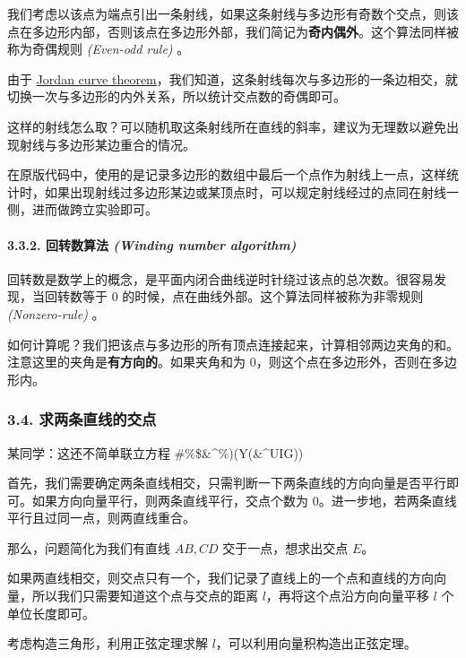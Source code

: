 我们考虑以该点为端点引出一条射线，如果这条射线与多边形有奇数个交点，则该点在多边形内部，否则该点在多边形外部，我们简记为\textbf{奇内偶外}。这个算法同样被称为奇偶规则 {\em (Even-odd rule) }。

由于 \href{https://en.wikipedia.org/wiki/Jordan_curve_theorem}{Jordan curve theorem}，我们知道，这条射线每次与多边形的一条边相交，就切换一次与多边形的内外关系，所以统计交点数的奇偶即可。

这样的射线怎么取？可以随机取这条射线所在直线的斜率，建议为无理数以避免出现射线与多边形某边重合的情况。

在原版代码中，使用的是记录多边形的数组中最后一个点作为射线上一点，这样统计时，如果出现射线过多边形某边或某顶点时，可以规定射线经过的点同在射线一侧，进而做跨立实验即可。

\paragraph{3.3.2. 回转数算法 {\em (Winding number algorithm) }}

回转数是数学上的概念，是平面内闭合曲线逆时针绕过该点的总次数。很容易发现，当回转数等于 $0$ 的时候，点在曲线外部。这个算法同样被称为非零规则 {\em (Nonzero-rule) }。

如何计算呢？我们把该点与多边形的所有顶点连接起来，计算相邻两边夹角的和。注意这里的夹角是\textbf{有方向的}。如果夹角和为 $0$，则这个点在多边形外，否则在多边形内。

\subsubsection{3.4. 求两条直线的交点}

\begin{QUOTE}{}{}
某同学：这还不简单联立方程 \#\%\$\&\textasciicircum{}\%)(Y(\&\textasciicircum{}UIG))
\end{QUOTE}

首先，我们需要确定两条直线相交，只需判断一下两条直线的方向向量是否平行即可。如果方向向量平行，则两条直线平行，交点个数为 $0$。进一步地，若两条直线平行且过同一点，则两直线重合。

那么，问题简化为我们有直线 $AB,CD$ 交于一点，想求出交点 $E$。

如果两直线相交，则交点只有一个，我们记录了直线上的一个点和直线的方向向量，所以我们只需要知道这个点与交点的距离 $l$，再将这个点沿方向向量平移 $l$ 个单位长度即可。

考虑构造三角形，利用正弦定理求解 $l$，可以利用向量积构造出正弦定理。

